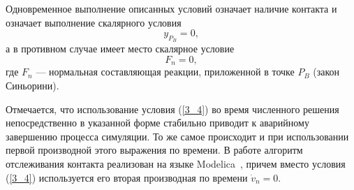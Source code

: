 
Одновременное выполнение описанных условий означает наличие
контакта и означает выполнение скалярного условия 
\begin{equation}
y_{P_B}=0,
\label{3_4}
\end{equation}
а в противном случае имеет место скалярное условие
$$
F_n=0,
$$
где $F_n$ --- нормальная составляющая реакции, приложенной в точке $P_B$ (закон Синьорини).


Отмечается, что использование условия (\ref{3_4}) во время численного решения
непосредственно в указанной форме стабильно приводит к аварийному завершению процесса симуляции.
То же самое происходит и при использовании первой производной этого выражения по времени.
В работе алгоритм отслеживания контакта  реализован на языке Modelica~\cite{Fritzson}, причем вместо условия (\ref{3_4}) используется  его вторая производная по времени $\dot{v}_n=0$.
%

